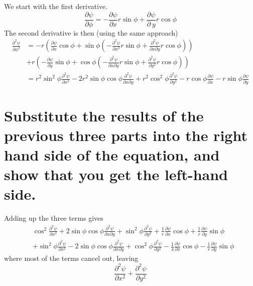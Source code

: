 \documentclass[answers]{exam}
\begin{document}
\begin{questions}
\begin{parts}
	\begin{solution}
		We start with the first derivative.
		$$\frac{\partial\psi}{\partial\phi} = -\frac{\partial\psi}{\partial x}r\sin\phi + \frac{\partial\psi}{\partial\ y}r\cos\phi$$
		The second derivative is then (using the same approach)
		\begin{align*}
			\frac{\partial^2\psi}{\partial\phi^2} &= -r\left(\frac{\partial\psi}{\partial x}\cos\phi + \sin\phi\left(-\frac{\partial^2\psi}{\partial x^2}r\sin\phi + \frac{\partial^2\psi}{\partial x\partial y}r\cos\phi\right)\right) \\
							      &+ r\left(-\frac{\partial\psi}{\partial y}\sin\phi + \cos\phi\left(-\frac{\partial^2\psi}{\partial x\partial y}r\sin\phi + \frac{\partial^2\psi}{\partial y^2}r\cos\phi\right)\right) \\
							      &= r^2\sin^2\phi\frac{\partial^2\psi}{\partial x^2} - 2r^2\sin\phi\cos\phi\frac{\partial^2\psi}{\partial x\partial y} + r^2\cos^2\phi\frac{\partial^2\psi}{\partial y^2} - r\cos\phi\frac{\partial\psi}{\partial x} - r\sin\phi\frac{\partial\psi}{\partial y}
		\end{align*}
	\end{solution}

	\part{Substitute the results of the previous three parts into the right hand side of the equation, and show that you get the left-hand side.}

	\begin{solution}
		Adding up the three terms gives
		\begin{align*}
			&\cos^2\frac{\partial^2\psi}{\partial x^2} + 2\sin\phi\cos\phi\frac{\partial^2\psi}{\partial x\partial y} + \sin^2\phi\frac{\partial^2\psi}{\partial y^2} + \frac{1}{r}\frac{\partial\psi}{\partial x}\cos\phi + \frac{1}{r}\frac{\partial\psi}{\partial y}\sin\phi \\
			&+ \sin^2\phi\frac{\partial^2\psi}{\partial x^2} - 2\sin\phi\cos\phi\frac{\partial^2\psi}{\partial x\partial y} + \cos^2\phi\frac{\partial^2\psi}{\partial y^2} - \frac{1}{4}\frac{\partial\psi}{\partial x}\cos\phi - \frac{1}{r}\frac{\partial\psi}{\partial y}\sin\phi
		\end{align*}
		where most of the terms cancel out, leaving
	$$\frac{\partial^2\psi}{\partial x^2} + \frac{\partial^2\psi}{\partial y^2}$$
	\end{solution}
\end{parts}


\end{questions}
\end{document}
